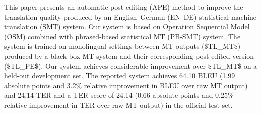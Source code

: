 This paper presents an automatic post-editing (APE) method to improve the translation quality produced by an English--German (EN--DE) statistical machine translation (SMT) system. Our system is based on Operation Sequential Model (OSM) combined with phrased-based statistical MT (PB-SMT) system. The system is trained on monolingual settings between MT outputs (\$TL\_{MT}\$) produced by a black-box MT system and their corresponding post-edited version (\$TL\_{PE}\$). Our system achieves considerable improvement over \$TL\_{MT}\$ on a held-out development set. The reported system achieves 64.10 BLEU (1.99 absolute points and 3.2\% relative improvement in BLEU over raw MT output) and 24.14 TER  and a TER score of 24.14 (0.66 absolute points and 0.25\% relative improvement in TER over raw MT output) in the official test set.
